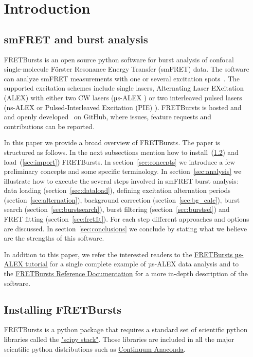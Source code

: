 \section{Introduction}

\subsection{smFRET and burst analysis}

FRETBursts is an open source python software for burst analysis of confocal 
single-molecule Förster Resonance Energy Transfer (smFRET) data. The software can analyze smFRET measurements
with one or several excitation spots~\cite{Ingargiola_2013}. The supported 
excitation schemes include single lasers, Alternating Laser EXcitation (ALEX) with either two CW lasers (µs-ALEX \cite{Kapanidis_2005}) 
or two interleaved pulsed lasers (ns-ALEX \cite{16287971} or Pulsed-Interleaved Excitation (PIE) \cite{M_ller_2005}). 
FRETBursts is hosted and and openly developed~\cite{Prli__2012} on GitHub, where
issues, feature requests and contributions can be reported.

In this paper we provide a broad overview of FRETBursts. 
The paper is structured as follows. 
In the next subsections mention how to install~(\ref{sec:install}) and 
load~(\ref{sec:import}) FRETBursts.
In section~\ref{sec:concepts} we
introduce a few preliminary concepts and some specific terminology.
In section~\ref{sec:analysis} we illustrate how to execute the several steps involved
in smFRET burst analysis: data loading (section~\ref{sec:dataload}), defining 
excitation alternation periods (section~\ref{sec:alternation}), background 
correction (section~\ref{sec:bg_calc}), burst search (section~\ref{sec:burstsearch}), 
burst filtering (section~\ref{sec:burstsel}) and FRET fitting (section~\ref{sec:fretfit}). 
For each step different approaches and options are discussed. 
In section~\ref{sec:conclusions} we conclude by stating what we believe are
the strengths of this software.

In addition to this paper, we refer the interested readers to the 
\href{http://nbviewer.ipython.org/github/tritemio/FRETBursts_notebooks/blob/master/notebooks/FRETBursts\%20-\%20us-ALEX\%20smFRET\%20burst\%20analysis.ipynb}{FRETBursts µs-ALEX tutorial} 
for a single complete example of µs-ALEX data analysis and to the
\href{http://fretbursts.readthedocs.org/}{FRETBursts Reference Documentation}
for a more in-depth description of the software.

\subsection{Installing FRETBursts}
\label{sec:install}
FRETBursts is a python package that requires a standard set of scientific 
python libraries called the \href{http://www.scipy.org/stackspec.html}{"scipy stack"}.
Those libraries are included in all the major scientific python distributions such as 
\href{https://store.continuum.io/cshop/anaconda/}{Continuum Anaconda}.

